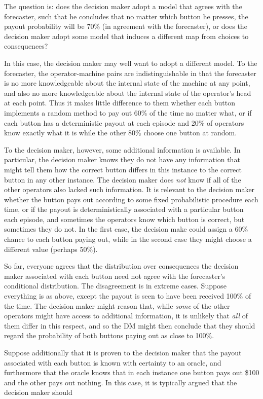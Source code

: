 The question is: does the decision maker adopt a model that agrees with the forecaster, such that he concludes that no matter which button he presses, the payout probability will be 70\% (in agreement with the forecaster), or does the decision maker adopt some model that induces a different map from choices to consequences?

In this case, the decision maker may well want to adopt a different model. To the forecaster, the operator-machine pairs are indistinguishable in that the forecaster is no more knowledgeable about the internal state of the machine at any point, and also no more knowledgeable about the internal state of the operator's head at each point. Thus it makes little difference to them whether each button implements a random method to pay out 60\% of the time no matter what, or if each button has a deterministic payout at each episode and 20\% of operators know exactly what it is while the other 80\% choose one button at random.

To the decision maker, however, some additional information is available. In particular, the decision maker knows they do not have any information that might tell them how the correct button differs in this instance to the correct button in any other instance. The decision maker does \emph{not} know if all of the other operators also lacked such information. It is relevant to the decision maker whether the button pays out according to some fixed probabilistic procedure each time, or if the payout is deterministically associated with a particular button each episode, and sometimes the operators know which button is correct, but sometimes they do not. In the first case, the decision make could assign a 60\% chance to each button paying out, while in the second case they might choose a different value (perhaps 50\%).

So far, everyone agrees that the distribution over consequences the decision maker associated with each button need not agree with the forecaster's conditional distribution. The disagreement is in extreme cases. Suppose everything is as above, except the payout is seen to have been received 100\% of the time. The decision maker might reason that, while \emph{some} of the other operators might have access to additional information, it is unlikely that \emph{all} of them differ in this respect, and so the DM might then conclude that they should regard the probability of both buttons paying out as close to 100\%.

Suppose additionally that it is proven to the decision maker that the payout associated with each button is known with certainty to an oracle, and furthermore that the oracle knows that in each instance one button pays out \$100 and the other pays out nothing. In this case, it is typically argued that the decision maker should 

